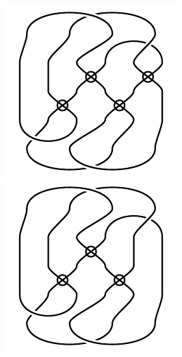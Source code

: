 \begin{figure}[H]
\begin{minipage}[b]{.18\linewidth}
\end{minipage}
\begin{minipage}[b]{.18\linewidth}
\centering
\includegraphics[width=\linewidth]{../data/virtual_4_29.png}
\end{minipage}
\begin{minipage}[b]{.18\linewidth}
\centering
\includegraphics[width=\linewidth]{../data/virtual_4_30.png}

\end{minipage}
\end{figure}
